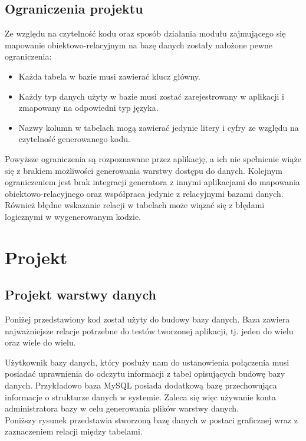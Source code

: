 \documentclass[12pt]{report}
\begin{document}
\subsection{Ograniczenia projektu}
	\indent Ze względu na czytelność kodu oraz sposób działania modułu zajmującego się mapowanie obiektowo-relacyjnym na bazę danych zostały nałożone pewne ograniczenia:
	\begin{itemize}
	\item{Każda tabela w bazie musi zawierać klucz główny.}
	\item{Każdy typ danych użyty w bazie musi zostać zarejestrowany w aplikacji i zmapowany na odpowiedni typ języka.}
	\item{Nazwy kolumn w tabelach mogą zawierać jedynie litery i cyfry ze względu na czytelność generowanego kodu.}
	\end{itemize}
	\indent Powyższe ograniczenia są rozpoznawane przez aplikację, a ich nie spełnienie wiąże się z brakiem możliwości generowania warstwy dostępu do danych. Kolejnym ograniczeniem jest brak integracji generatora z innymi aplikacjami do mapowania obiektowo-relacyjnego oraz współpraca jedynie z relacyjnymi bazami danych. Również błędne wskazanie relacji w tabelach może wiązać się z błędami logicznymi w wygenerowanym kodzie.
\section{Projekt}
\subsection{Projekt warstwy danych}\label{sec:database}
\indent Poniżej przedstawiony kod został użyty do budowy bazy danych. Baza zawiera najważniejsze relacje potrzebne do testów tworzonej aplikacji, tj. jeden do wielu oraz wiele do wielu.
\begin{framed}

\end{framed}

Użytkownik bazy danych, który posłuży nam do ustanowienia połączenia musi posiadać uprawnienia do odczytu informacji z tabel opisujących budowę bazy danych. Przykładowo baza MySQL posiada dodatkową bazę przechowująca informacje o strukturze danych w systemie. Zaleca się więc używanie konta administratora bazy w celu generowania plików warstwy danych.\\
\indent Poniższy rysunek przedstawia stworzoną bazę danych w postaci graficznej wraz z zaznaczeniem relacji między tabelami.
\end{document}
